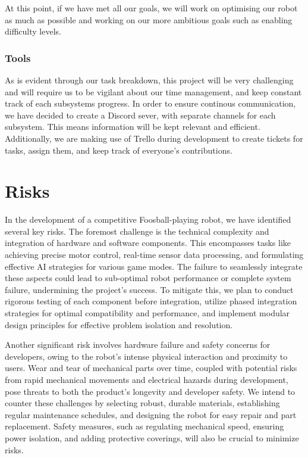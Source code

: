 \documentclass{article}
\begin{document}
At this point, if we have met all our goals, we will work on optimising our robot as much as possible and working on our more ambitious goals such as enabling difficulty levels.

\subsubsection{Tools}
As is evident through our task breakdown, this project will be very challenging and will require us to be vigilant about our time management, and keep constant track of each subsystems progress. In order to ensure continous communication, we have decided to create a Discord \cite{discord} sever, with separate channels for each subsystem. This means information will be kept relevant and efficient. Additionally, we are making use of Trello \cite{trello} during development to create tickets for tasks, assign them, and keep track of everyone's contributions. 
\section{Risks}
In the development of a competitive Foosball-playing robot, we have identified several key risks. The foremost challenge is the technical complexity and integration of hardware and software components. This encompasses tasks like achieving precise motor control, real-time sensor data processing, and formulating effective AI strategies for various game modes. The failure to seamlessly integrate these aspects could lead to sub-optimal robot performance or complete system failure, undermining the project’s success. To
mitigate this, we plan to conduct rigorous testing of each component before integration, utilize phased integration strategies for optimal compatibility and performance, and implement modular design principles for effective problem isolation and resolution. 

Another significant risk involves hardware failure and safety concerns for developers, owing to the robot's intense physical interaction and proximity to users. Wear and tear of mechanical parts over time, coupled with potential risks from rapid mechanical movements and electrical hazards during development, pose threats to both the product's longevity and developer safety. We intend to counter these challenges by selecting robust, durable materials, establishing regular maintenance schedules, and designing the robot for easy repair and part replacement. Safety measures, such as regulating mechanical speed, ensuring power isolation, and adding protective coverings, will also be crucial to minimize risks.
\end{document}
